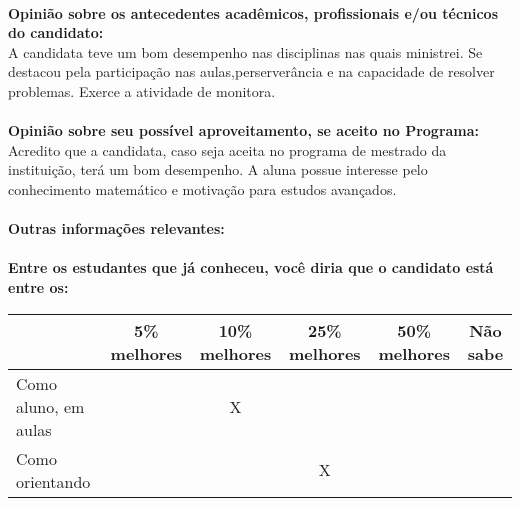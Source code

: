 \documentclass[11pt]{article}
\begin{document}
\\
\textbf{Opinião sobre os antecedentes acadêmicos, profissionais e/ou técnicos do candidato:}
\\A candidata teve um bom desempenho nas disciplinas nas quais ministrei. Se destacou pela participação nas aulas,perserverância e na capacidade de resolver problemas. Exerce a atividade de monitora. \\
\\
\textbf{Opinião sobre seu possível aproveitamento, se aceito no Programa:}
\\Acredito que a candidata, caso seja aceita no programa de mestrado da instituição, terá um bom desempenho. A aluna possue interesse pelo conhecimento matemático e motivação para estudos avançados. \\ 
\\
\textbf{Outras informações relevantes:} \\
\\[0.3cm]
\textbf{Entre os estudantes que já conheceu, você diria que o candidato está entre os:}
\\
\begin{tabular}{|l|c|c|c|c|c|}
\hline
 & 5\% melhores & 10\% melhores & 25\% melhores & 50\% melhores & Não sabe \\
\hline
Como aluno, em aulas &  & X &  &  & \\
\hline
Como orientando &  &  & X &  & \\
\hline
\end{tabular}
\end{document}

